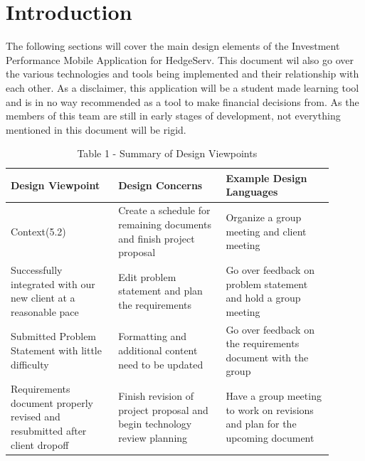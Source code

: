 \documentclass[onecolumn, draftclsnofoot,10pt, compsoc]{IEEEtran}
\begin{document}
\section{Introduction}

    The following sections will cover the main design elements of the Investment Performance Mobile
    Application for HedgeServ. This document wil also go over the various technologies and tools being implemented and their
    relationship with each other. As a disclaimer, this application will be a student made learning tool and is in
    no way recommended as a tool  to make financial decisions from. As the members of this team are still in early stages of development,
    not everything mentioned in this document will be rigid. 
      
	\begin{table}[h]
                        \caption{Table 1 - Summary of Design Viewpoints}
                                \begin{tabular}{| p{0.3\linewidth} | p{0.3\linewidth} | p{0.3\linewidth} | }
                                        \hline
                                         \textbf{Design Viewpoint} & \textbf{Design Concerns} & \textbf{Example Design Languages} \\ [0.5ex]
                                        \hline
                                        Context(5.2)  & Create a schedule for remaining documents and finish project proposal & Organize a group meeting and client meeting  \\
                                        \hline
                                         Successfully integrated with our new client at a reasonable pace & Edit problem statement and plan the requirements & Go over feedback on problem statement and hold a group meeting \\
                                        \hline
                                         Submitted Problem Statement with little difficulty & Formatting and additional content need to be updated & Go over feedback on the requirements document with the group \\
                                        \hline
                                        Requirements document properly revised and resubmitted after client dropoff & Finish revision of project proposal and begin technology review planning & Have a group meeting to work on revisions and plan for the upcoming document\\

\end{tabular}
\end{table}
\end{document}
